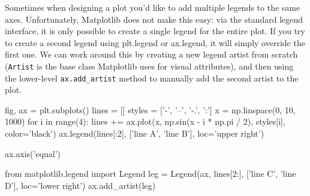 Sometimes when designing a plot you'd like to add multiple legends to the same axes.
Unfortunately, Matplotlib does not make this easy: via the standard legend interface,
it is only possible to create a single legend for the entire plot. If you try to create a
second legend using plt.legend or ax.legend, it will simply override the first one.
We can work around this by creating a new legend artist from scratch (\verb|Artist| is the
base class Matplotlib uses for visual attributes), and then using the lower-level
\verb|ax.add_artist| method to manually add the second artist to the plot.


\begin{pyc}
    fig, ax = plt.subplots()
    lines = []
    styles = ['-', '--', '-.', ':']
    x = np.linspace(0, 10, 1000)
    for i in range(4):
    lines += ax.plot(x, np.sin(x - i * np.pi / 2),
    styles[i], color='black')
    ax.legend(lines[:2], ['line A', 'line B'], loc='upper right')

    ax.axis('equal')

    from matplotlib.legend import Legend
    leg = Legend(ax, lines[2:], ['line C', 'line D'], loc='lower right')
    ax.add_artist(leg)
\end{pyc}
